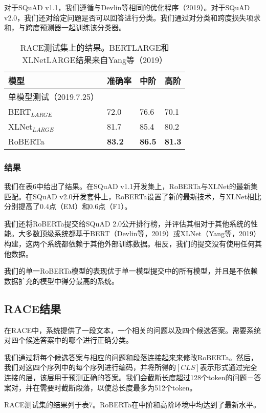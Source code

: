 \documentclass[lang=cn,11pt,a4paper,twocolumn]{elegantpaper}
\begin{document}
对于SQuAD v1.1，我们遵循与Devlin等相同的优化程序（2019）。对于SQuAD v2.0，我们还对给定问题是否可以回答进行分类。我们通过对分类和跨度损失项求和，与跨度预测器一起训练该分类器。

\begin{table}[]
  \centering
  \begin{tabular}{llll}
  \hline
  \textbf{模型}      & \textbf{准确率}  & 中阶            & \textbf{高阶}   \\ \hline
  单模型测试（2019.7.25） &               &               &               \\
  BERT$_{LARGE}$   & 72.0          & 76.6          & 70.1          \\
  XLNet$_{LARGE}$  & 81.7          & 85.4          & 80.2          \\ \hline
  RoBERTa          & \textbf{83.2} & \textbf{86.5} & \textbf{81.3} \\ \hline
  \end{tabular}
  \caption{RACE测试集上的结果。BERTLARGE和XLNetLARGE结果来自Yang等（2019）}
  \end{table}
\subsubsection*{结果}
我们在表6中给出了结果。在SQuAD v1.1开发集上，RoBERTa与XLNet的最新集匹配。在SQuAD v2.0开发套件上，RoBERTa设置了新的最新技术，与XLNet相比分别提高了0.4点（EM）和0.6点（F1）。

我们还将RoBERTa提交给SQuAD 2.0公开排行榜，并评估其相对于其他系统的性能。大多数顶级系统都基于BERT（Devlin等，2019）或XLNet（Yang等，2019）构建，这两个系统都依赖于其他外部训练数据。相反，我们的提交没有使用任何其他数据。

我们的单一RoBERTa模型的表现优于单一模型提交中的所有模型，并且是不依赖数据扩充的模型中得分最高的系统。


\subsection{RACE结果}
在RACE中，系统提供了一段文本，一个相关的问题以及四个候选答案。需要系统对四个候选答案中的哪个进行正确分类。

我们通过将每个候选答案与相应的问题和段落连接起来来修改RoBERTa。然后，我们对这四个序列中的每个序列进行编码，并将所得的$[CLS]$表示形式通过完全连接的层，该层用于预测正确的答案。我们会截断长度超过128个token的问题－答案对，并在需要时截断段落，以使总长度最多为512个token。

RACE测试集的结果列于表7。RoBERTa在中阶和高阶环境中均达到了最新水平。
\end{document}
